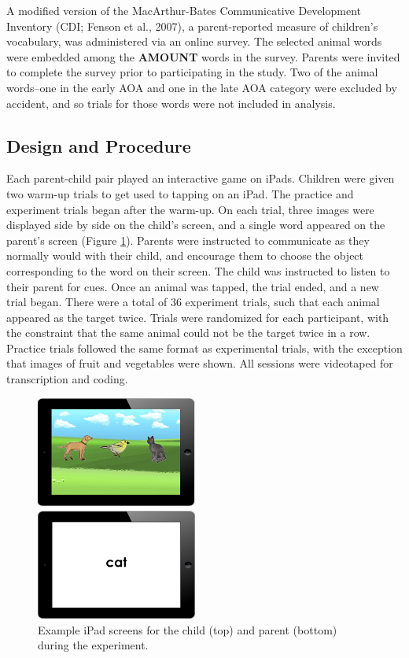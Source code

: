 \documentclass[10pt, letterpaper]{article}
\newenvironment{CodeChunk}{}{}
\begin{document}
A modified version of the MacArthur-Bates Communicative Development
Inventory (CDI; Fenson et al., 2007), a parent-reported measure of
children's vocabulary, was administered via an online survey. The
selected animal words were embedded among the \textbf{AMOUNT} words in
the survey. Parents were invited to complete the survey prior to
participating in the study. Two of the animal words--one in the early
AOA and one in the late AOA category were excluded by accident, and so
trials for those words were not included in analysis.

\hypertarget{design-and-procedure}{%
\subsection{Design and Procedure}\label{design-and-procedure}}

Each parent-child pair played an interactive game on iPads. Children
were given two warm-up trials to get used to tapping on an iPad. The
practice and experiment trials began after the warm-up. On each trial,
three images were displayed side by side on the child's screen, and a
single word appeared on the parent's screen (Figure \ref{fig:ipads}).
Parents were instructed to communicate as they normally would with their
child, and encourage them to choose the object corresponding to the word
on their screen. The child was instructed to listen to their parent for
cues. Once an animal was tapped, the trial ended, and a new trial began.
There were a total of 36 experiment trials, such that each animal
appeared as the target twice. Trials were randomized for each
participant, with the constraint that the same animal could not be the
target twice in a row. Practice trials followed the same format as
experimental trials, with the exception that images of fruit and
vegetables were shown. All sessions were videotaped for transcription
and coding.

\begin{CodeChunk}
\begin{figure}[tb]

{\centering \includegraphics[width=200px]{figs/ipads} 

}

\caption[Example iPad screens for the child (top) and parent (bottom) during the experiment]{Example iPad screens for the child (top) and parent (bottom) during the experiment.}\label{fig:ipads}
\end{figure}
\end{CodeChunk}
\end{document}

